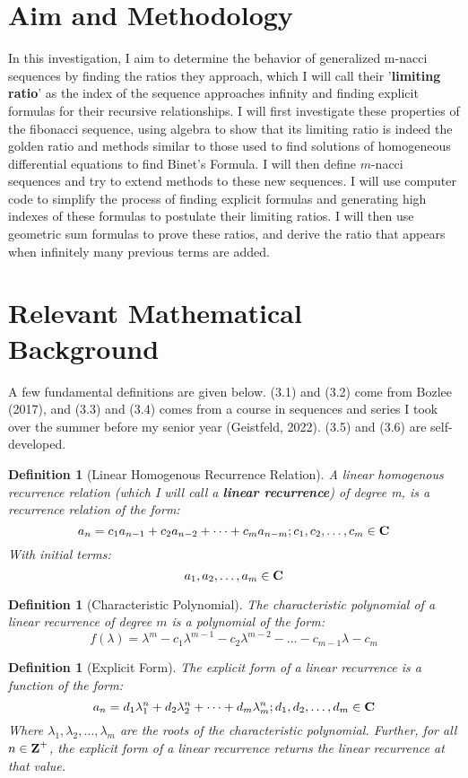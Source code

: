 \documentclass[11pt]{article}
\newtheorem{definition}[theorem]{Definition}
\begin{document}
\section{Aim and Methodology}

In this investigation, I aim to determine the behavior of generalized m-nacci sequences by finding the ratios they approach, which I will call their '\textbf{limiting ratio}’ as the index of the sequence approaches infinity and finding explicit formulas for their recursive relationships. I will first investigate these properties of the fibonacci sequence, using algebra to show that its limiting ratio is indeed the golden ratio and methods similar to those used to find solutions of homogeneous differential equations to find Binet’s Formula. I will then define \(m\)-nacci sequences and try to extend methods to these new sequences. I will use computer code to simplify the process of finding explicit formulas and generating high indexes of these formulas to postulate their limiting ratios. I will then use geometric sum formulas to prove these ratios, and derive the ratio that appears when infinitely many previous terms are added. 


\section{Relevant Mathematical Background}
A few fundamental definitions are given below. (3.1) and (3.2) come from Bozlee (2017), and (3.3) and (3.4) comes from a course in sequences and series I took over the summer before my senior year (Geistfeld, 2022). (3.5) and (3.6) are self-developed.

\begin{definition}[Linear Homogenous Recurrence Relation] A linear homogenous recurrence relation (which I will call a \textbf{linear recurrence}) of degree \mbox{m}, is a recurrence relation of the form:
    $$a_n=c_1a_{n-1}+c_2a_{n-2}+\dots +c_ma_{n-m}; c_1,c_2,\dots,c_m\in \mbox{\textbf{C}}$$ 
    With initial terms: 
    $$a_1,a_2,\dots,a_m\in\mbox{\textbf{C}}$$
\end{definition}

\begin{definition}[Characteristic Polynomial] The characteristic polynomial of a linear recurrence of degree \(m\) is a polynomial of the form:
    $$f(\lambda) = \lambda^{m}-c_1\lambda^{m-1}-c_2\lambda^{m-2}-\dots-c_{m-1}\lambda-c_m$$ 
\end{definition}

\begin{definition}[Explicit Form] The explicit form of a linear recurrence is a function of the form:
    $$a_n=d_1\lambda_1^n+d_2\lambda_2^n+\dots+d_m\lambda_m^n; d_1,d_2,\dots,d_m \in\mbox{\textbf{C}}$$ 
    Where \mbox{$\lambda_1,\lambda_2,\dots,\lambda_m$} are the roots of the characteristic polynomial. Further, for all \(n\in \mbox{\textbf{Z}}^+\), the explicit form of a linear recurrence returns the linear recurrence at that value.
\end{definition}
\end{document}
